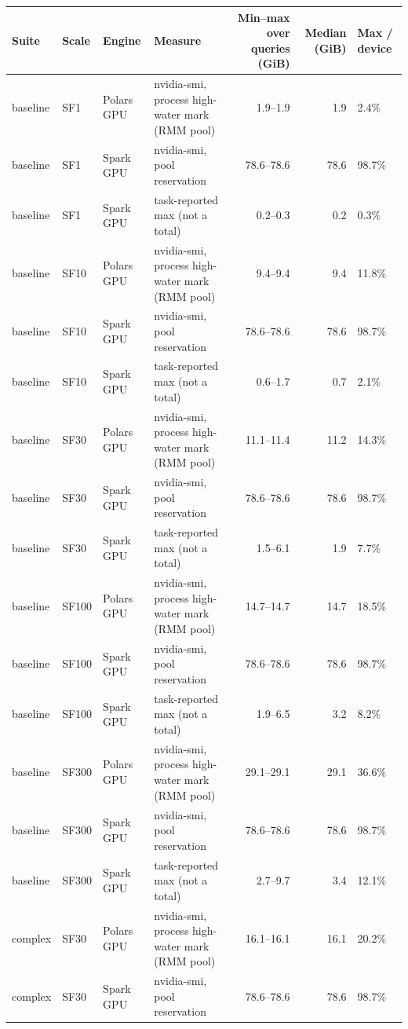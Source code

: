 \begin{tabular}{llllrrl}
\toprule
Suite & Scale & Engine & Measure & Min--max over queries (GiB) & Median (GiB) & Max / device \\
\midrule
baseline & SF1 & Polars GPU & nvidia-smi, process high-water mark (RMM pool) & 1.9--1.9 & 1.9 & 2.4\% \\
baseline & SF1 & Spark GPU & nvidia-smi, pool reservation & 78.6--78.6 & 78.6 & 98.7\% \\
baseline & SF1 & Spark GPU & task-reported max (not a total) & 0.2--0.3 & 0.2 & 0.3\% \\
baseline & SF10 & Polars GPU & nvidia-smi, process high-water mark (RMM pool) & 9.4--9.4 & 9.4 & 11.8\% \\
baseline & SF10 & Spark GPU & nvidia-smi, pool reservation & 78.6--78.6 & 78.6 & 98.7\% \\
baseline & SF10 & Spark GPU & task-reported max (not a total) & 0.6--1.7 & 0.7 & 2.1\% \\
baseline & SF30 & Polars GPU & nvidia-smi, process high-water mark (RMM pool) & 11.1--11.4 & 11.2 & 14.3\% \\
baseline & SF30 & Spark GPU & nvidia-smi, pool reservation & 78.6--78.6 & 78.6 & 98.7\% \\
baseline & SF30 & Spark GPU & task-reported max (not a total) & 1.5--6.1 & 1.9 & 7.7\% \\
baseline & SF100 & Polars GPU & nvidia-smi, process high-water mark (RMM pool) & 14.7--14.7 & 14.7 & 18.5\% \\
baseline & SF100 & Spark GPU & nvidia-smi, pool reservation & 78.6--78.6 & 78.6 & 98.7\% \\
baseline & SF100 & Spark GPU & task-reported max (not a total) & 1.9--6.5 & 3.2 & 8.2\% \\
baseline & SF300 & Polars GPU & nvidia-smi, process high-water mark (RMM pool) & 29.1--29.1 & 29.1 & 36.6\% \\
baseline & SF300 & Spark GPU & nvidia-smi, pool reservation & 78.6--78.6 & 78.6 & 98.7\% \\
baseline & SF300 & Spark GPU & task-reported max (not a total) & 2.7--9.7 & 3.4 & 12.1\% \\
complex & SF30 & Polars GPU & nvidia-smi, process high-water mark (RMM pool) & 16.1--16.1 & 16.1 & 20.2\% \\
complex & SF30 & Spark GPU & nvidia-smi, pool reservation & 78.6--78.6 & 78.6 & 98.7\% \\

\end{tabular}
